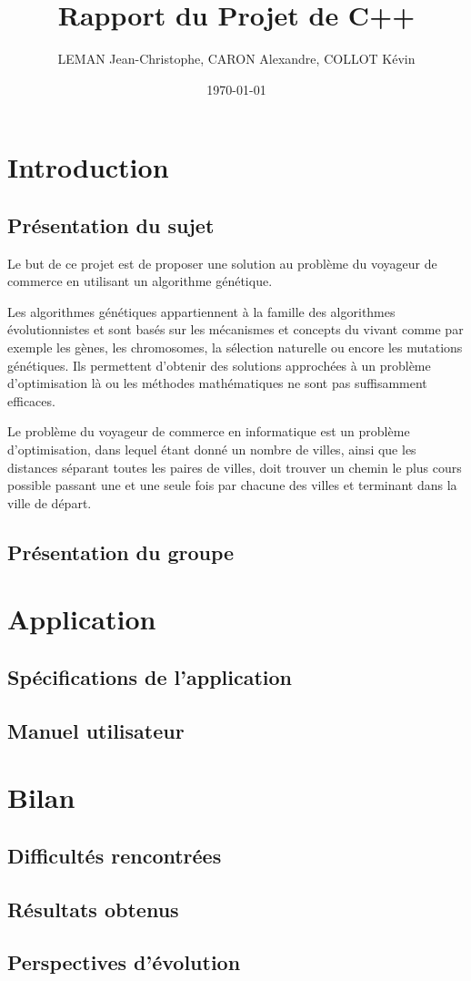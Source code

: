 \documentclass{report}
\title{Rapport du Projet de C++}
\author{LEMAN Jean-Christophe, CARON Alexandre, COLLOT Kévin}
\date{\today}
\begin{document}
\maketitle
\tableofcontents


\chapter{Introduction}
\section{Présentation du sujet}
Le but de ce projet est de proposer une solution au problème du voyageur de commerce en utilisant un algorithme génétique.
\par Les algorithmes génétiques appartiennent à la famille des algorithmes évolutionnistes et sont basés sur les mécanismes et concepts du vivant comme par exemple les gènes, les chromosomes, la sélection naturelle ou encore les mutations génétiques. Ils permettent d'obtenir des solutions approchées à un problème d'optimisation là ou les méthodes mathématiques ne sont pas suffisamment efficaces.\par 
Le problème du voyageur de commerce en informatique est un problème d'optimisation, dans lequel étant donné un nombre de villes, ainsi que les distances séparant toutes les paires de villes, doit trouver un chemin le plus cours possible passant une et une seule fois par chacune des villes et terminant dans la ville de départ.
\section{Présentation du groupe}

\chapter{Application}
\section{Spécifications de l'application}

\section{Manuel utilisateur}

\chapter{Bilan}
\section{Difficultés rencontrées}

\section{Résultats obtenus}

\section{Perspectives d'évolution}
\end{document}

